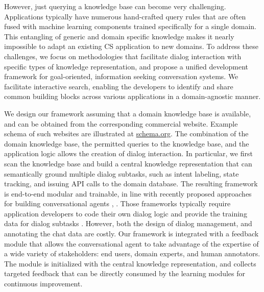 \documentclass[letterpaper]{article} %
\begin{document}
However, just querying a knowledge base can become very challenging. %
Applications typically have numerous hand-crafted query rules that are often fused with machine learning components trained specifically for a single domain. This entangling of generic and domain specific knowledge makes it nearly impossible to adapt an existing CS application to new domains. 
To address these challenges, we focus on methodologies that facilitate dialog interaction with specific types of knowledge representation, and propose a unified development framework for goal-oriented, information seeking conversation systems.
We facilitate interactive search, enabling the developers to identify and share common building blocks across various applications in a domain-agnostic manner. 


We design our framework assuming that a domain knowledge base is available, and can be obtained from the corresponding commercial website. Example schema of such websites are illustrated at \url{schema.org}. The combination of the domain knowledge base, the permitted queries to the knowledge base, and the application logic 
allows the creation of dialog interaction. In particular, we first scan the knowledge base and build a central knowledge representation that can semantically ground multiple dialog subtasks, such as intent labeling, state tracking, and issuing API calls to the domain database. The resulting framework is end-to-end modular and trainable, in line with recently proposed approaches for building conversational agents \cite{rasa}, \cite{truong2017maca}. Those frameworks typically require application developers to code their own dialog logic and provide the training data for dialog subtasks \cite{rasa}. However, both the design of dialog management, and annotating the chat data are costly. Our framework is integrated with a feedback module that allows the conversational agent to take advantage of the expertise of a wide variety of stakeholders: end users,  domain experts, and human annotators. The module is initialized with the central knowledge representation, and collects targeted feedback that can be directly consumed by the learning modules 
for continuous improvement. 
\end{document}
